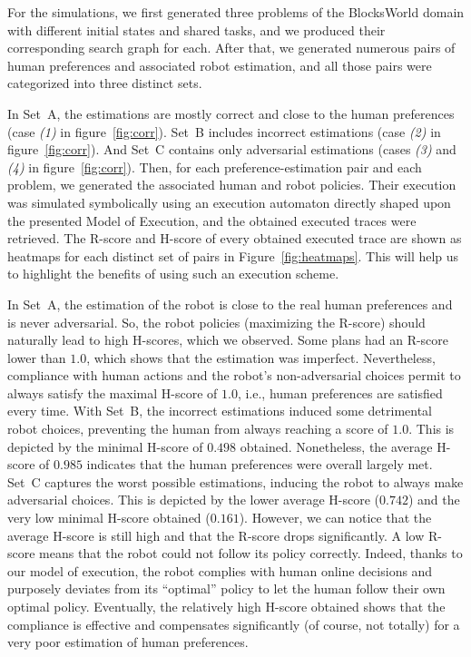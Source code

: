 For the simulations, we first generated three problems of the BlocksWorld domain with different initial states and shared tasks, and we produced their corresponding search graph for each. 
After that, we generated numerous pairs of human preferences and associated robot estimation, and all those pairs were categorized into three distinct sets.

In Set~A, the estimations are mostly correct and close to the human preferences (case \textit{(1)} in figure~\ref{fig:corr}). Set~B includes incorrect estimations (case \textit{(2)} in figure~\ref{fig:corr}). And Set~C contains only adversarial estimations (cases \textit{(3)} and \textit{(4)} in figure~\ref{fig:corr}).
Then, for each preference-estimation pair and each problem, we generated the associated human and robot policies. Their execution was simulated symbolically using an execution automaton directly shaped upon the presented Model of Execution, and the obtained executed traces were retrieved.
The R-score and H-score of every obtained executed trace are shown as heatmaps for each distinct set of pairs in Figure~\ref{fig:heatmaps}. This will help us to highlight the benefits of using such an execution scheme.

In Set~A, the estimation of the robot is close to the real human preferences and is never adversarial. So, the robot policies (maximizing the R-score) should naturally lead to high H-scores, which we observed.
Some plans had an R-score lower than $1.0$, which shows that the estimation was imperfect. Nevertheless, compliance with human actions and the robot's non-adversarial choices permit to always satisfy the maximal H-score of $1.0$, i.e., human preferences are satisfied every time. 
With Set~B, the incorrect estimations induced some detrimental robot choices, preventing the human from always reaching a score of $1.0$. This is depicted by the minimal H-score of $0.498$ obtained. Nonetheless, the average H-score of $0.985$ indicates that the human preferences were overall largely met.
Set~C captures the worst possible estimations, inducing the robot to always make adversarial choices. This is depicted by the lower average H-score ($0.742$) and the very low minimal H-score obtained ($0.161$). 
However, we can notice that the average H-score is still high and that the R-score drops significantly. A low R-score means that the robot could not follow its policy correctly. Indeed, thanks to our model of execution, the robot complies with human online decisions and purposely deviates from its ``optimal'' policy to let the human follow their own optimal policy. Eventually, the relatively high H-score obtained shows that the compliance is effective and compensates significantly (of course, not totally) for a very poor estimation of human preferences. 

